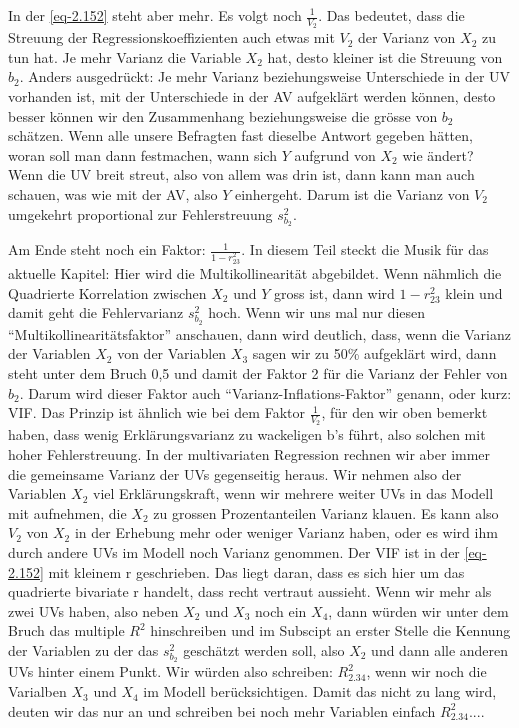 \documentclass[
  10pt,
  letterpaper,
  a4paper, twoside]{scrreprt}
\begin{document}
\begin{tcolorbox}
In der \eqref{eq-2.152} steht aber mehr. Es volgt noch
\(\frac{1}{V_2}\). Das bedeutet, dass die Streuung der
Regressionskoeffizienten auch etwas mit \(V_2\) der Varianz von \(X_2\)
zu tun hat. Je mehr Varianz die Variable \(X_2\) hat, desto kleiner ist
die Streuung von \(b_2\). Anders ausgedrückt: Je mehr Varianz
beziehungsweise Unterschiede in der UV vorhanden ist, mit der
Unterschiede in der AV aufgeklärt werden können, desto besser können wir
den Zusammenhang beziehungsweise die grösse von \(b_2\) schätzen. Wenn
alle unsere Befragten fast dieselbe Antwort gegeben hätten, woran soll
man dann festmachen, wann sich \(Y\) aufgrund von \(X_2\) wie ändert?
Wenn die UV breit streut, also von allem was drin ist, dann kann man
auch schauen, was wie mit der AV, also \(Y\) einhergeht. Darum ist die
Varianz von \(V_2\) umgekehrt proportional zur Fehlerstreuung
\(s^2_{b_2}\).

Am Ende steht noch ein Faktor: \(\frac{1}{1-r^2_{23}}\). In diesem Teil
steckt die Musik für das aktuelle Kapitel: Hier wird die
Multikollinearität abgebildet. Wenn nähmlich die Quadrierte Korrelation
zwischen \(X_2\) und \(Y\) gross ist, dann wird \(1-r_{23}^2\) klein und
damit geht die Fehlervarianz \(s_{b_2}^2\) hoch. Wenn wir uns mal nur
diesen \enquote{Multikollinearitätsfaktor} anschauen, dann wird
deutlich, dass, wenn die Varianz der Variablen \(X_2\) von der Variablen
\(X_3\) sagen wir zu 50\% aufgeklärt wird, dann steht unter dem Bruch
0,5 und damit der Faktor 2 für die Varianz der Fehler von \(b_2\). Darum
wird dieser Faktor auch \enquote{Varianz-Inflations-Faktor} genann, oder
kurz: VIF. Das Prinzip ist ähnlich wie bei dem Faktor \(\frac{1}{V_2}\),
für den wir oben bemerkt haben, dass wenig Erklärungsvarianz zu
wackeligen b's führt, also solchen mit hoher Fehlerstreuung. In der
multivariaten Regression rechnen wir aber immer die gemeinsame Varianz
der UVs gegenseitig heraus. Wir nehmen also der Variablen \(X_2\) viel
Erklärungskraft, wenn wir mehrere weiter UVs in das Modell mit
aufnehmen, die \(X_2\) zu grossen Prozentanteilen Varianz klauen. Es
kann also \(V_2\) von \(X_2\) in der Erhebung mehr oder weniger Varianz
haben, oder es wird ihm durch andere UVs im Modell noch Varianz
genommen. Der VIF ist in der \eqref{eq-2.152} mit kleinem r geschrieben.
Das liegt daran, dass es sich hier um das quadrierte bivariate r
handelt, dass recht vertraut aussieht. Wenn wir mehr als zwei UVs haben,
also neben \(X_2\) und \(X_3\) noch ein \(X_4\), dann würden wir unter
dem Bruch das multiple \(R^2\) hinschreiben und im Subscipt an erster
Stelle die Kennung der Variablen zu der das \(s_{b_2}^2\) geschätzt
werden soll, also \(X_2\) und dann alle anderen UVs hinter einem Punkt.
Wir würden also schreiben: \(R^2_2.34\), wenn wir noch die Varialben
\(X_3\) und \(X_4\) im Modell berücksichtigen. Damit das nicht zu lang
wird, deuten wir das nur an und schreiben bei noch mehr Variablen
einfach \(R^2_2.34...\).


\end{tcolorbox}
\end{document}
